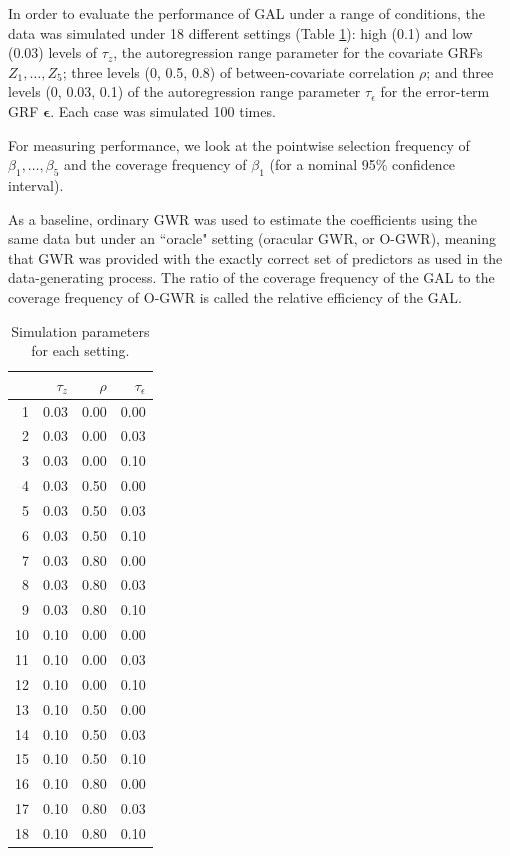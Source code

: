 \documentclass[authoryear, review, 11pt]{elsarticle}
\begin{document}
	In order to evaluate the performance of GAL under a range of conditions, the data was simulated under 18 different settings (Table \ref{table:simulation_settings}): high (0.1) and low (0.03) levels of $\tau_z$, the autoregression range parameter for the covariate GRFs $Z_1, \dots, Z_5$; three levels (0, 0.5, 0.8) of between-covariate correlation $\rho$; and three levels (0, 0.03, 0.1) of the autoregression range parameter $\tau_{\epsilon}$ for the error-term GRF $\bm{\epsilon}$. Each case was simulated 100 times.
	
	For measuring performance, we look at the pointwise selection frequency of $\beta_1, \dots, \beta_5$ and the coverage frequency of $\beta_1$ (for a nominal 95\% confidence interval).
	
	As a baseline, ordinary GWR was used to estimate the coefficients using the same data but under an ``oracle" setting (oracular GWR, or O-GWR), meaning that GWR was provided with the exactly correct set of predictors as used in the data-generating process. The ratio of the coverage frequency of the GAL to the coverage frequency of O-GWR is called the relative efficiency of the GAL.\\
	
\begin{table}[h!]
	\begin{center}
	\begin{tabular}{rrrr}
		\hline
		& $\tau_z$ & $\rho$ & $\tau_{\epsilon}$ \\ 
		\hline
		1 & 0.03 & 0.00 & 0.00 \\ 
		2 & 0.03 & 0.00 & 0.03 \\ 
		3 & 0.03 & 0.00 & 0.10 \\ 
		4 & 0.03 & 0.50 & 0.00 \\ 
		5 & 0.03 & 0.50 & 0.03 \\ 
		6 & 0.03 & 0.50 & 0.10 \\ 
		7 & 0.03 & 0.80 & 0.00 \\ 
		8 & 0.03 & 0.80 & 0.03 \\ 
		9 & 0.03 & 0.80 & 0.10 \\ 
		10 & 0.10 & 0.00 & 0.00 \\ 
		11 & 0.10 & 0.00 & 0.03 \\ 
		12 & 0.10 & 0.00 & 0.10 \\ 
		13 & 0.10 & 0.50 & 0.00 \\ 
		14 & 0.10 & 0.50 & 0.03 \\ 
		15 & 0.10 & 0.50 & 0.10 \\ 
		16 & 0.10 & 0.80 & 0.00 \\ 
		17 & 0.10 & 0.80 & 0.03 \\ 
		18 & 0.10 & 0.80 & 0.10
	\end{tabular}
	\end{center}
	\caption{Simulation parameters for each setting.\label{table:simulation_settings}}
\end{table}
	
\end{document}
